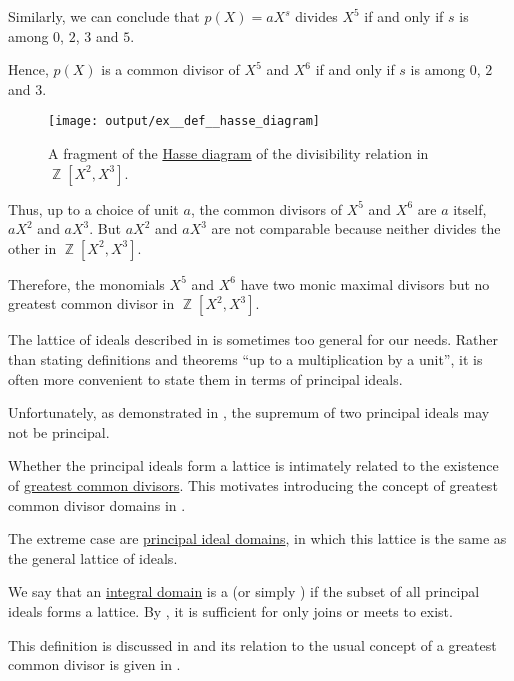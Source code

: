 \begin{example}
\begin{thmenum}
    Similarly, we can conclude that \( p(X) = aX^s \) divides \( X^5 \) if and only if \( s \) is among \( 0 \), \( 2 \), \( 3 \) and \( 5 \).

    Hence, \( p(X) \) is a common divisor of \( X^5 \) and \( X^6 \) if and only if \( s \) is among \( 0 \), \( 2 \) and \( 3 \).

    \begin{figure}[!ht]
      \centering
      \texttt{[image: output/ex\_\_def\_\_hasse\_diagram]}
      \caption{A fragment of the \hyperref[def:hasse_diagram]{Hasse diagram} of the divisibility relation in \( \BbbZ[X^2, X^3] \).}
      \label{fig:ex:common_polynomial_divisors/distinct}
    \end{figure}

    Thus, up to a choice of unit \( a \), the common divisors of \( X^5 \) and \( X^6 \) are \( a \) itself, \( aX^2 \) and \( aX^3 \). But \( aX^2 \) and \( aX^3 \) are not comparable because neither divides the other in \( \BbbZ[X^2, X^3] \).

    Therefore, the monomials \( X^5 \) and \( X^6 \) have two monic maximal divisors but no greatest common divisor in \( \BbbZ[X^2, X^3] \).
  \end{thmenum}
\end{example}

\begin{remark}\label{rem:lattice_of_principal_ideals}
  The lattice of ideals described in  is sometimes too general for our needs. Rather than stating definitions and theorems \enquote{up to a multiplication by a unit}, it is often more convenient to state them in terms of principal ideals.

  Unfortunately, as demonstrated in , the supremum of two principal ideals may not be principal.

  Whether the principal ideals form a lattice is intimately related to the existence of \hyperref[def:gcd_and_lcm]{greatest common divisors}. This motivates introducing the concept of greatest common divisor domains in .

  The extreme case are \hyperref[def:principal_ideal_domain]{principal ideal domains}, in which this lattice is the same as the general lattice of ideals.
\end{remark}

\begin{definition}\label{def:gcd_domain}\mimprovised
  We say that an \hyperref[def:integral_domain]{integral domain} is a  (or simply ) if the subset of all principal ideals forms a lattice. By , it is sufficient for only joins or meets to exist.

  This definition is discussed in  and its relation to the usual concept of a greatest common divisor is given in .
\end{definition}

